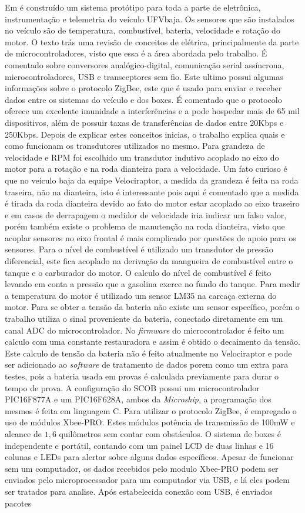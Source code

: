 Em \cite{Dias2010} é construído um sistema protótipo para toda a parte de eletrônica, instrumentação e telemetria do veículo UFVbaja. Os sensores que são instalados no veículo são de temperatura, combustível, bateria, velocidade e rotação do motor. O texto trás uma revisão de conceitos de elétrica, principalmente da parte de microcontroladores, visto que essa é a área abordada pelo trabalho. É comentado sobre conversores analógico-digital, comunicação serial assíncrona, microcontroladores, USB e transceptores sem fio. Este ultimo possui algumas informações sobre o protocolo ZigBee, este que é usado para enviar e receber dados entre os sistemas do veículo e dos boxes. É comentado que o protocolo oferece um excelente imunidade a interferências e a pode hospedar mais de 65 mil dispositivos, além de possuir taxas de transferências de dados entre 20Kbps e 250Kbps. Depois de explicar estes conceitos inicias, o trabalho explica quais e como funcionam os transdutores utilizados no mesmo. Para grandeza de velocidade e RPM foi escolhido um transdutor indutivo acoplado no eixo do motor para a rotação e na roda dianteira para a velocidade. Um fato curioso é que no veículo baja da equipe Velociraptor, a medida da grandeza é feita na roda traseira, não na dianteira, isto é interessante pois aqui é comentado que a medida é tirada da roda dianteira devido ao fato do motor estar acoplado ao eixo traseiro e em casos de derrapagem o medidor de velocidade iria indicar um falso valor, porém também existe o problema de manutenção na roda dianteira, visto que acoplar sensores no eixo frontal é mais complicado por questões de apoio para os sensores. Para o nível de combustível é utilizado um transdutor de pressão diferencial, este fica acoplado na derivação da mangueira de combustível entre o tanque e o carburador do motor. O calculo do nível de combustível é feito levando em conta a pressão que a gasolina exerce no fundo do tanque. Para medir a temperatura do motor é utilizado um sensor LM35 na carcaça externa do motor. Para se obter a tensão da bateria não existe um sensor específico, porém o trabalho utiliza o sinal proveniente da bateria, conectado diretamente em um canal ADC do microcontrolador. No \textit{firmware} do microcontrolador é feito um calculo com uma constante restauradora e assim é obtido o decaimento da tensão. Este calculo de tensão da bateria não é feito atualmente no Velociraptor e pode ser adicionado ao \textit{software} de tratamento de dados porem como um extra para testes, pois a bateria usada em provas é calculada previamente para durar o tempo de prova. A configuração do SCOB possui um microcontrolador PIC16F877A e um PIC16F628A, ambos da \textit{Microship}, a programação dos mesmos é feita em linguagem C. Para utilizar o protocolo ZigBee, é empregado o uso de módulos Xbee-PRO. Estes módulos potência de transmissão de 100mW e alcance de $1,6$ quilômetros sem contar com obstáculos. O sistema de boxes é independente e portátil, contando com um painel LCD de duas linhas e 16 colunas e LEDs para alertar sobre alguns dados específicos. Apesar de funcionar sem um computador, os dados recebidos pelo modulo Xbee-PRO podem ser enviados pelo microprocessador para um computador via USB, e lá eles podem ser tratados para analise. Após estabelecida conexão com USB, é enviados pacotes 